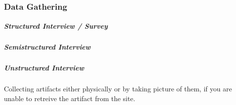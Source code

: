 \subsubsection{Data Gathering}
\label{sec:1_data_gathering}

\begin{concept}[Interview] \label{conc:interview} 

  
\end{concept}

\subparagraph{Structured Interview / Survey}  


\subparagraph{Semistructured Interview} 


\subparagraph{Unstructured Interview} 


\begin{method}[Observation] \label{meth:observation} 
  
\end{method}

\begin{method} \label{meth:contextual_interview} 
  
\end{method}

\begin{definition}[Artifact] \label{def:artifact} 
  
\end{definition}

\begin{method} \label{meth:artifact_collection} 
  Collecting artifacts either physically or by taking picture of them, if you are unable to retreive the artifact from the site.
\end{method}